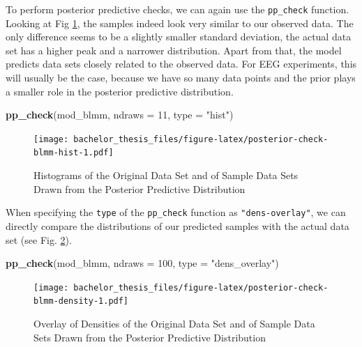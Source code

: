\documentclass[
  doc,12pt,floatsintext]{apa7}
\newenvironment{Shaded}{\begin{snugshade}}{\end{snugshade}}
\newcommand{\AttributeTok}[1]{\textcolor[rgb]{0.13,0.29,0.53}{#1}}
\newcommand{\DecValTok}[1]{\textcolor[rgb]{0.00,0.00,0.81}{#1}}
\newcommand{\FunctionTok}[1]{\textcolor[rgb]{0.13,0.29,0.53}{\textbf{#1}}}
\newcommand{\NormalTok}[1]{#1}
\newcommand{\StringTok}[1]{\textcolor[rgb]{0.31,0.60,0.02}{#1}}
\begin{document}
To perform posterior predictive checks, we can again use the \texttt{pp\_check} function. Looking at Fig \ref{fig:posterior-check-blmm-hist}, the samples indeed look very similar to our observed data. The only difference seems to be a slightly smaller standard deviation, the actual data set has a higher peak and a narrower distribution. Apart from that, the model predicts data sets closely related to the observed data. For EEG experiments, this will usually be the case, because we have so many data points and the prior plays a smaller role in the posterior predictive distribution.



\begin{Shaded}
\begin{Highlighting}[]
\FunctionTok{pp\_check}\NormalTok{(mod\_blmm, }\AttributeTok{ndraws =} \DecValTok{11}\NormalTok{, }\AttributeTok{type =} \StringTok{"hist"}\NormalTok{)}
\end{Highlighting}
\end{Shaded}

\begin{figure}
\centering
\texttt{[image: bachelor\_thesis\_files/figure-latex/posterior-check-blmm-hist-1.pdf]}
\caption{\label{fig:posterior-check-blmm-hist}Histograms of the Original Data Set and of Sample Data Sets Drawn from the Posterior Predictive Distribution}
\end{figure}

When specifying the \texttt{type} of the \texttt{pp\_check} function as \texttt{"dens-overlay"}, we can directly compare the distributions of our predicted samples with the actual data set (see Fig. \ref{fig:posterior-check-blmm-density}).



\begin{Shaded}
\begin{Highlighting}[]
\FunctionTok{pp\_check}\NormalTok{(mod\_blmm, }\AttributeTok{ndraws =} \DecValTok{100}\NormalTok{, }\AttributeTok{type =} \StringTok{"dens\_overlay"}\NormalTok{)}
\end{Highlighting}
\end{Shaded}

\begin{figure}
\centering
\texttt{[image: bachelor\_thesis\_files/figure-latex/posterior-check-blmm-density-1.pdf]}
\caption{\label{fig:posterior-check-blmm-density}Overlay of Densities of the Original Data Set and of Sample Data Sets Drawn from the Posterior Predictive Distribution}
\end{figure}
\end{document}
